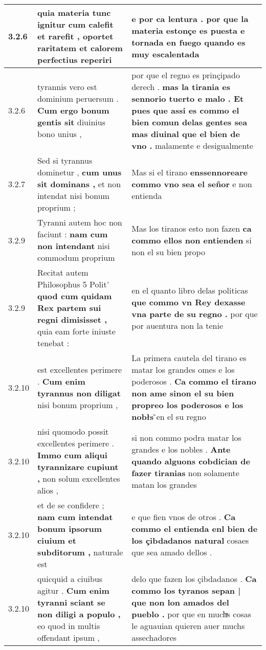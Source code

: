 \begin{tabular}{|p{1cm}|p{6.5cm}|p{6.5cm}|}
3.2.6 & quia materia tunc ignitur \textbf{ cum calefit et rarefit , } oportet raritatem et calorem perfectius reperiri & e por ca lentura . \textbf{ por que la materia estonçe es puesta e tornada en fuego } quando es muy escalentada \\\hline
3.2.6 & tyrannis vero est dominium peruersum . \textbf{ Cum ergo bonum gentis sit } diuinius bono unius , & por que el regno es prinçipado derech . \textbf{ mas la tirania es sennorio tuerto e malo . Et pues que assi es commo el bien comun delas gentes sea mas diuinal que el bien de vno . } malamente e desigualmente \\\hline
3.2.7 & Sed si tyrannus dominetur , \textbf{ cum unus sit dominans , } et non intendat nisi bonum proprium ; & Mas si el tirano \textbf{ enssennoreare commo vno sea el señor } e non entienda \\\hline
3.2.9 & Tyranni autem hoc non faciunt : \textbf{ nam cum non intendant } nisi commodum proprium & Mas los tiranos esto non fazen \textbf{ ca commo ellos non entienden } si non el su bien propo \\\hline
3.2.9 & Recitat autem Philosophus 5 Polit’ \textbf{ quod cum quidam Rex partem sui regni dimisisset , } quia eam forte iniuste tenebat : & en el quanto libro delas politicas \textbf{ que commo vn Rey dexasse vna parte de su regno . } por que por auentura non la tenie \\\hline
3.2.10 & est excellentes perimere . \textbf{ Cum enim tyrannus non diligat } nisi bonum proprium , & La primera cautela del tirano es matar los grandes omes e los poderosos . \textbf{ Ca commo el tirano non ame sinon el su bien propreo los poderosos e los nobłs } ̃en el su regno \\\hline
3.2.10 & nisi quomodo possit excellentes perimere . \textbf{ Immo cum aliqui tyrannizare cupiunt , } non solum excellentes alios , & si non commo podra matar los grandes e los nobles . \textbf{ Ante quando alguons cobdician de fazer tiranias } non solamente matan los grandes \\\hline
3.2.10 & et de se confidere ; \textbf{ nam cum intendat bonum ipsorum ciuium et subditorum , } naturale est & e que fien vnos de otros . \textbf{ Ca commo el entienda enl bien de los çibdadanos natural } cosaes que sea amado dellos . \\\hline
3.2.10 & quicquid a ciuibus agitur . \textbf{ Cum enim tyranni sciant se non diligi a populo , } eo quod in multis offendant ipsum , & delo que fazen los çibdadanos . \textbf{ Ca commo los tyranos sepan | que non lon amados del pueblo . } por que en muchͣs cosas le aguauian quieren auer muchs assechadores \\\hline

\end{tabular}
